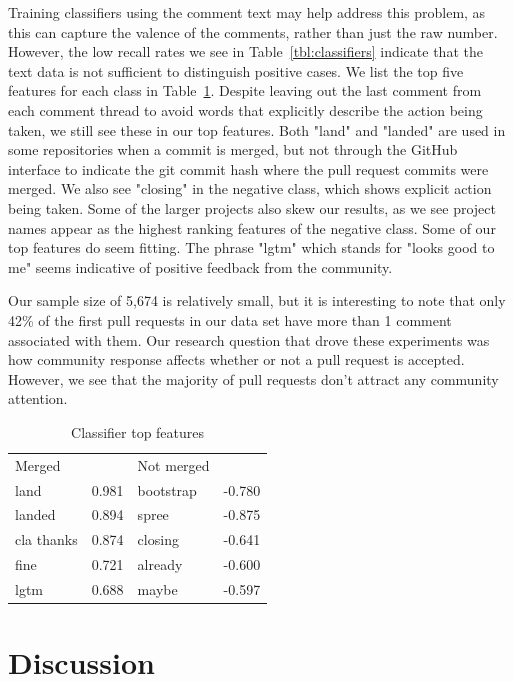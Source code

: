 \documentclass{sigchi}
\begin{document}
Training classifiers using the comment text may help address this problem, as
this can capture the valence of the comments, rather than just the raw number.
However, the low recall rates we see in Table~\ref{tbl:classifiers} indicate
that the text data is not sufficient to distinguish positive cases. We list the
top five features for each class in Table~\ref{tbl:features}. Despite leaving
out the last comment from each comment thread to avoid words that explicitly
describe the action being taken, we still see these in our top features. Both
"land" and "landed" are used in some repositories when a commit is merged, but
not through the GitHub interface to indicate the git commit hash where the pull
request commits were merged. We also see "closing" in the negative class, which
shows explicit action being taken. Some of the larger projects also skew our
results, as we see project names appear as the highest ranking features of the
negative class. Some of our top features do seem fitting. The phrase "lgtm"
which stands for "looks good to me" seems indicative of positive feedback from
the community.

Our sample size of 5,674 is relatively small, but it is interesting to note that
only 42\% of the first pull requests in our data set have more than 1 comment
associated with them. Our research question that drove these experiments was how
community response affects whether or not a pull request is accepted. However,
we see that the majority of pull requests don't attract any community attention.

\begin{table}[ht] \centering
\caption{Classifier top features}
\label{tbl:features}
\begin{tabular}{ll|ll}
\hline\hline
Merged  & ~     & Not merged  & ~      \\
land    & 0.981 & bootstrap & -0.780 \\
landed  & 0.894 & spree   & -0.875 \\
cla thanks    & 0.874 & closing & -0.641 \\
fine    & 0.721 &  already & -0.600 \\
lgtm    & 0.688 & maybe & -0.597 \\
\hline
\end{tabular}
\end{table}

\section{Discussion} \label{chap:conclusion}
\end{document}
